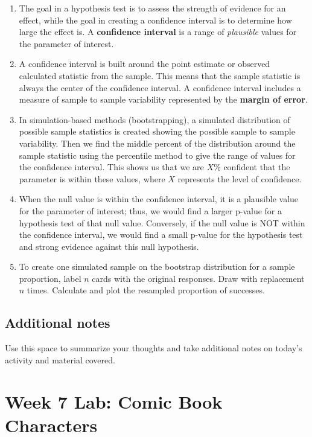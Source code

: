 \documentclass[
]{report}
\begin{document}
\begin{enumerate}
\def\labelenumi{\arabic{enumi}.}
\item
  The goal in a hypothesis test is to assess the strength of evidence for an effect, while the goal in creating a confidence interval is to determine how large the effect is. A \textbf{confidence interval} is a range of \emph{plausible} values for the parameter of interest.
\item
  A confidence interval is built around the point estimate or observed calculated statistic from the sample. This means that the sample statistic is always the center of the confidence interval. A confidence interval includes a measure of sample to sample variability represented by the \textbf{margin of error}.
\item
  In simulation-based methods (bootstrapping), a simulated distribution of possible sample statistics is created showing the possible sample to sample variability. Then we find the middle percent of the distribution around the sample statistic using the percentile method to give the range of values for the confidence interval. This shows us that we are \(X\)\% confident that the parameter is within these values, where \(X\) represents the level of confidence.
\item
  When the null value is within the confidence interval, it is a plausible value for the parameter of interest; thus, we would find a larger p-value for a hypothesis test of that null value. Conversely, if the null value is NOT within the confidence interval, we would find a small p-value for the hypothesis test and strong evidence against this null hypothesis.
\item
  To create one simulated sample on the bootstrap distribution for a sample proportion, label \(n\) cards with the original responses. Draw with replacement \(n\) times. Calculate and plot the resampled proportion of successes.
\end{enumerate}

\hypertarget{additional-notes-10}{%
\subsection{Additional notes}\label{additional-notes-10}}

Use this space to summarize your thoughts and take additional notes on today's activity and material covered.

\newpage

\hypertarget{week-7-lab-comic-book-characters}{%
\section{Week 7 Lab: Comic Book Characters}\label{week-7-lab-comic-book-characters}}
\end{document}
